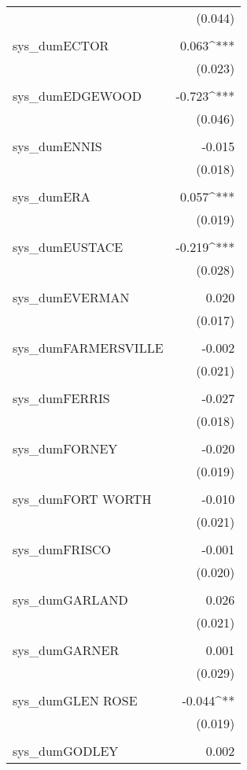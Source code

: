 \begin{table}[!htbp]
\begin{tabular}{@{\extracolsep{5pt}}lD{.}{.}{-3} }
  & (0.044) \\ 
  & \\ 
 sys\_dumECTOR & 0.063^{***} \\ 
  & (0.023) \\ 
  & \\ 
 sys\_dumEDGEWOOD & -0.723^{***} \\ 
  & (0.046) \\ 
  & \\ 
 sys\_dumENNIS & -0.015 \\ 
  & (0.018) \\ 
  & \\ 
 sys\_dumERA & 0.057^{***} \\ 
  & (0.019) \\ 
  & \\ 
 sys\_dumEUSTACE & -0.219^{***} \\ 
  & (0.028) \\ 
  & \\ 
 sys\_dumEVERMAN & 0.020 \\ 
  & (0.017) \\ 
  & \\ 
 sys\_dumFARMERSVILLE & -0.002 \\ 
  & (0.021) \\ 
  & \\ 
 sys\_dumFERRIS & -0.027 \\ 
  & (0.018) \\ 
  & \\ 
 sys\_dumFORNEY & -0.020 \\ 
  & (0.019) \\ 
  & \\ 
 sys\_dumFORT WORTH & -0.010 \\ 
  & (0.021) \\ 
  & \\ 
 sys\_dumFRISCO & -0.001 \\ 
  & (0.020) \\ 
  & \\ 
 sys\_dumGARLAND & 0.026 \\ 
  & (0.021) \\ 
  & \\ 
 sys\_dumGARNER & 0.001 \\ 
  & (0.029) \\ 
  & \\ 
 sys\_dumGLEN ROSE & -0.044^{**} \\ 
  & (0.019) \\ 
  & \\ 
 sys\_dumGODLEY & 0.002 \\ 

\end{tabular}
\end{table}
